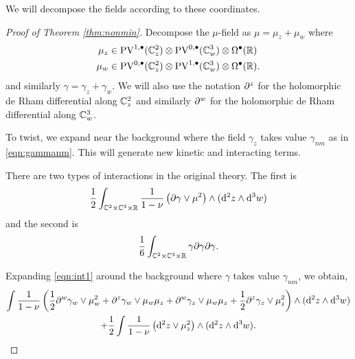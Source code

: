 We will decompose the fields according to these coordinates. 
\begin{proof}[Proof of Theorem \ref{thm:nonmin}]
Decompose the $\mu$-field as $\mu = \mu_z + \mu_w$ where
\begin{align*}
\mu_z  &\in {\rm PV}^{1,\bullet}(\mathbb C^2_z) \otimes {\rm PV}^{0,\bullet}(\mathbb C^3_w) \otimes \Omega^\bullet(\mathbb R) \\
\mu_w & \in {\rm PV}^{0,\bullet}(\mathbb C^2_z) \otimes {\rm PV}^{1,\bullet}(\mathbb C^3_w) \otimes \Omega^\bullet(\mathbb R)  .
\end{align*}
and similarly $\gamma = \gamma_z + \gamma_w$. 
We will also use the notation $\partial^z$ for the holomorphic de Rham differential along $\mathbb C_z^2$ and similarly $\partial^w$ for the holomorphic de Rham differential along $\mathbb C^3_w$. 

To twist, we expand near the background where the field $\gamma_z$ takes value $\gamma_{nm}$ as in \eqref{eqn:gammanm}. 
This will generate new kinetic and interacting terms. 

There are two types of interactions in the original theory.
The first is
\begin{equation}\label{eqn:int1}
  \frac12 \int_{\mathbb C^2 \times \mathbb C^3 \times \mathbb R} \frac{1}{1-\nu} \left(\partial \gamma \vee \mu^2 \right) \wedge ({\rm d}^2 z \wedge {\rm d}^3 w)
\end{equation}
and the second is
\begin{equation} \label{eqn:int2}
  \frac16\int_{\mathbb C^2 \times \mathbb C^3 \times \mathbb R} \gamma \partial \gamma \partial \gamma .
\end{equation}

Expanding \eqref{eqn:int1} around the background where $\gamma$ takes value $\gamma_{nm}$, we obtain,
\begin{multline}
 \int \frac{1}{1-\nu} \left(\frac12 \partial^w \gamma_w \vee \mu_w^2  + \partial^z \gamma_w \vee \mu_w \mu_z + \partial^w \gamma_z \vee \mu_w\mu_z + \frac12 \partial^z \gamma_z \vee \mu_z^2 \right) \wedge ({\rm d}^2 z \wedge {\rm d}^3 w) 
 \\
  + \frac{1}{2} \int \frac{1}{1-\nu} \left({\rm d}^2 z \vee \mu_z^2 \right) \wedge ({\rm d}^2 z \wedge {\rm d}^3 w) .
  \label{eqn:delta1}
\end{multline}


\end{proof}
